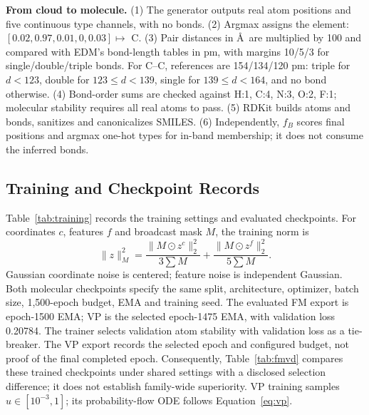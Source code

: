 \documentclass{article}
\begin{document}
\textbf{From cloud to molecule.} (1) The generator outputs real atom positions and five continuous type channels, with no bonds. (2) Argmax assigns the element: $[0.02,0.97,0.01,0,0.03]\mapsto$ C. (3) Pair distances in \AA\ are multiplied by 100 and compared with EDM's bond-length tables in pm, with margins 10/5/3 for single/double/triple bonds. For C--C, references are 154/134/120 pm: triple for $d<123$, double for $123\le d<139$, single for $139\le d<164$, and no bond otherwise. (4) Bond-order sums are checked against H:1, C:4, N:3, O:2, F:1; molecular stability requires all real atoms to pass. (5) RDKit builds atoms and bonds, sanitizes and canonicalizes SMILES. (6) Independently, $f_B$ scores final positions and argmax one-hot types for in-band membership; it does not consume the inferred bonds.

\subsection{Training and Checkpoint Records}\label{app:training}
Table~\ref{tab:training} records the training settings and evaluated checkpoints. For coordinates $c$, features $f$ and broadcast mask $M$, the training norm is
\[
\|z\|_M^2=\frac{\|M\odot z^c\|_2^2}{3\sum M}+\frac{\|M\odot z^f\|_2^2}{5\sum M}.
\]
Gaussian coordinate noise is centered; feature noise is independent Gaussian. Both molecular checkpoints specify the same split, architecture, optimizer, batch size, 1,500-epoch budget, EMA and training seed. The evaluated FM export is epoch-1500 EMA; VP is the selected epoch-1475 EMA, with validation loss 0.20784. The trainer selects validation atom stability with validation loss as a tie-breaker. The VP export records the selected epoch and configured budget, not proof of the final completed epoch. Consequently, Table~\ref{tab:fmvd} compares these trained checkpoints under shared settings with a disclosed selection difference; it does not establish family-wide superiority. VP training samples $u\in[10^{-3},1]$; its probability-flow ODE follows Equation~\eqref{eq:vp}.
\end{document}
